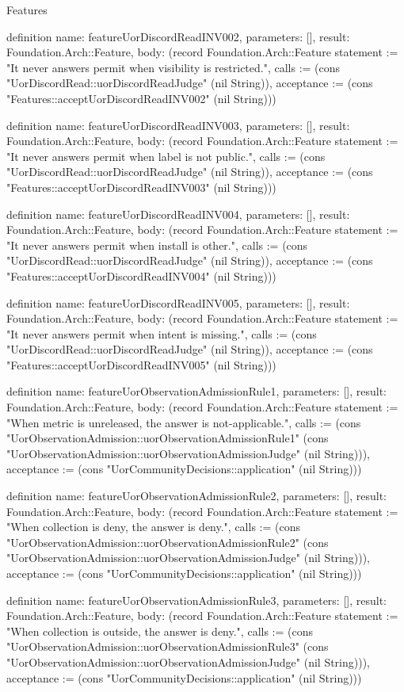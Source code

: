\begin{lexlean}{Features}
\begin{semanticmodule}
definition{
  name: featureUorDiscordReadINV002,
  parameters: [],
  result: Foundation.Arch::Feature,
  body: (record Foundation.Arch::Feature {statement := "It never answers permit when visibility is restricted.", calls := (cons "UorDiscordRead::uorDiscordReadJudge" (nil String)), acceptance := (cons "Features::acceptUorDiscordReadINV002" (nil String))})
}

definition{
  name: featureUorDiscordReadINV003,
  parameters: [],
  result: Foundation.Arch::Feature,
  body: (record Foundation.Arch::Feature {statement := "It never answers permit when label is not public.", calls := (cons "UorDiscordRead::uorDiscordReadJudge" (nil String)), acceptance := (cons "Features::acceptUorDiscordReadINV003" (nil String))})
}

definition{
  name: featureUorDiscordReadINV004,
  parameters: [],
  result: Foundation.Arch::Feature,
  body: (record Foundation.Arch::Feature {statement := "It never answers permit when install is other.", calls := (cons "UorDiscordRead::uorDiscordReadJudge" (nil String)), acceptance := (cons "Features::acceptUorDiscordReadINV004" (nil String))})
}

definition{
  name: featureUorDiscordReadINV005,
  parameters: [],
  result: Foundation.Arch::Feature,
  body: (record Foundation.Arch::Feature {statement := "It never answers permit when intent is missing.", calls := (cons "UorDiscordRead::uorDiscordReadJudge" (nil String)), acceptance := (cons "Features::acceptUorDiscordReadINV005" (nil String))})
}

definition{
  name: featureUorObservationAdmissionRule1,
  parameters: [],
  result: Foundation.Arch::Feature,
  body: (record Foundation.Arch::Feature {statement := "When metric is unreleased, the answer is not-applicable.", calls := (cons "UorObservationAdmission::uorObservationAdmissionRule1" (cons "UorObservationAdmission::uorObservationAdmissionJudge" (nil String))), acceptance := (cons "UorCommunityDecisions::application" (nil String))})
}

definition{
  name: featureUorObservationAdmissionRule2,
  parameters: [],
  result: Foundation.Arch::Feature,
  body: (record Foundation.Arch::Feature {statement := "When collection is deny, the answer is deny.", calls := (cons "UorObservationAdmission::uorObservationAdmissionRule2" (cons "UorObservationAdmission::uorObservationAdmissionJudge" (nil String))), acceptance := (cons "UorCommunityDecisions::application" (nil String))})
}

definition{
  name: featureUorObservationAdmissionRule3,
  parameters: [],
  result: Foundation.Arch::Feature,
  body: (record Foundation.Arch::Feature {statement := "When collection is outside, the answer is deny.", calls := (cons "UorObservationAdmission::uorObservationAdmissionRule3" (cons "UorObservationAdmission::uorObservationAdmissionJudge" (nil String))), acceptance := (cons "UorCommunityDecisions::application" (nil String))})
}


\end{semanticmodule}
\end{lexlean}
